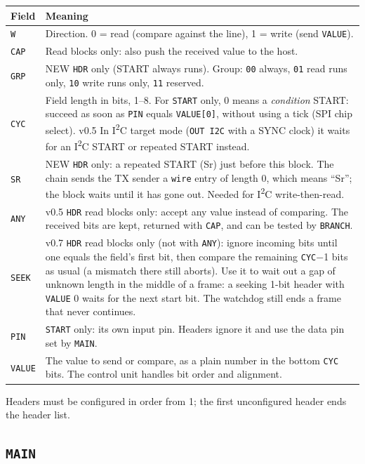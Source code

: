 \documentclass[11pt,a4paper]{article}
\newcommand{\new}{\textcolor{newc}{\textsf{\small NEW}}}
\newcommand{\vfive}{\textcolor{fivec}{\textsf{\small v0.5}}}
\newcommand{\vseven}{\textcolor{sevenc}{\textsf{\small v0.7}}}
\newcommand{\sig}[1]{\texttt{#1}}
\begin{document}
\begin{tabularx}{\linewidth}{@{}l>{\raggedright\arraybackslash}X@{}}
\toprule
Field & Meaning \\
\midrule
\sig{W} & Direction. 0 = read (compare against the line), 1 = write (send \sig{VALUE}). \\
\sig{CAP} & Read blocks only: also push the received value to the host. \\
\sig{GRP} & \new{} \sig{HDR} only (START always runs). Group: \texttt{00} always, \texttt{01} read runs only, \texttt{10} write runs only, \texttt{11} reserved. \\
\sig{CYC} & Field length in bits, 1--8. For \sig{START} only, 0 means a \emph{condition} START: succeed as soon as \sig{PIN} equals \sig{VALUE[0]}, without using a tick (SPI chip select). \vfive{} In I\textsuperscript{2}C target mode (\sig{OUT I2C} with a SYNC clock) it waits for an I\textsuperscript{2}C START or repeated START instead. \\
\sig{SR} & \new{} \sig{HDR} only: a repeated START (Sr) just before this block. The chain sends the TX sender a \sig{wire} entry of length 0, which means ``Sr''; the block waits until it has gone out. Needed for I\textsuperscript{2}C write-then-read. \\
\sig{ANY} & \vfive{} \sig{HDR} read blocks only: accept any value instead of comparing. The received bits are kept, returned with \sig{CAP}, and can be tested by \sig{BRANCH}. \\
\sig{SEEK} & \vseven{} \sig{HDR} read blocks only (not with \sig{ANY}): ignore incoming bits until one equals the field's first bit, then compare the remaining \sig{CYC}$-$1 bits as usual (a mismatch there still aborts). Use it to wait out a gap of unknown length in the middle of a frame: a seeking 1-bit header with \sig{VALUE} 0 waits for the next start bit. The watchdog still ends a frame that never continues. \\
\sig{PIN} & \sig{START} only: its own input pin. Headers ignore it and use the data pin set by \sig{MAIN}. \\
\sig{VALUE} & The value to send or compare, as a plain number in the bottom \sig{CYC} bits. The control unit handles bit order and alignment. \\
\bottomrule
\end{tabularx}

Headers must be configured in order from 1; the first unconfigured header ends the header list.

\subsection{\sig{MAIN}}
\end{document}
